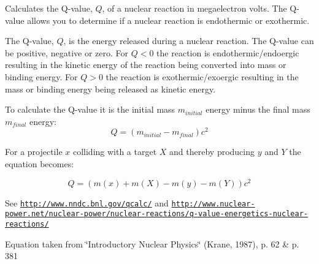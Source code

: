 Calculates the Q-\/value, $Q$, of a nuclear reaction in megaelectron volts. The Q-\/value allows you to determine if a nuclear reaction is endothermic or exothermic. 

The Q-\/value, $Q$, is the energy released during a nuclear reaction. The Q-\/value can be positive, negative or zero. For $Q < 0$ the reaction is endothermic/endoergic resulting in the kinetic energy of the reaction being converted into mass or binding energy. For $Q > 0$ the reaction is exothermic/exoergic resulting in the mass or binding energy being released as kinetic energy.

To calculate the Q-\/value it is the initial mass $m_{initial}$ energy minus the final mass $m_{final}$ energy\+: \[Q = \left ( m_{initial}-m_{final}\right ) c^2\]

For a projectile $x$ colliding with a target $X$ and thereby producing $y$ and $Y$ the equation becomes\+:

\[Q = \left ( m(x) + m (X) - m(y) - m(Y) \right ) c^2\]

See \href{http://www.nndc.bnl.gov/qcalc/}{\tt http\+://www.\+nndc.\+bnl.\+gov/qcalc/} and \href{http://www.nuclear-power.net/nuclear-power/nuclear-reactions/q-value-energetics-nuclear-reactions/}{\tt http\+://www.\+nuclear-\/power.\+net/nuclear-\/power/nuclear-\/reactions/q-\/value-\/energetics-\/nuclear-\/reactions/}

Equation taken from \char`\"{}\+Introductory Nuclear Physics\char`\"{} (Krane, 1987), p. 62 \& p. 381


